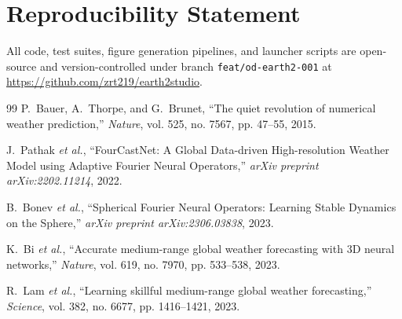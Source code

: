 \documentclass[10pt,twocolumn,letterpaper]{article}
\begin{document}
\section*{Reproducibility Statement}
All code, test suites, figure generation pipelines, and launcher scripts are open-source and version-controlled under branch \texttt{feat/od-earth2-001} at \url{https://github.com/zrt219/earth2studio}.

\begin{thebibliography}{99}
P.~Bauer, A.~Thorpe, and G.~Brunet, ``The quiet revolution of numerical weather prediction,'' \emph{Nature}, vol. 525, no. 7567, pp. 47--55, 2015.

J.~Pathak \emph{et al.}, ``FourCastNet: A Global Data-driven High-resolution Weather Model using Adaptive Fourier Neural Operators,'' \emph{arXiv preprint arXiv:2202.11214}, 2022.

B.~Bonev \emph{et al.}, ``Spherical Fourier Neural Operators: Learning Stable Dynamics on the Sphere,'' \emph{arXiv preprint arXiv:2306.03838}, 2023.

K.~Bi \emph{et al.}, ``Accurate medium-range global weather forecasting with 3D neural networks,'' \emph{Nature}, vol. 619, no. 7970, pp. 533--538, 2023.

R.~Lam \emph{et al.}, ``Learning skillful medium-range global weather forecasting,'' \emph{Science}, vol. 382, no. 6677, pp. 1416--1421, 2023.
\end{thebibliography}
\end{document}
